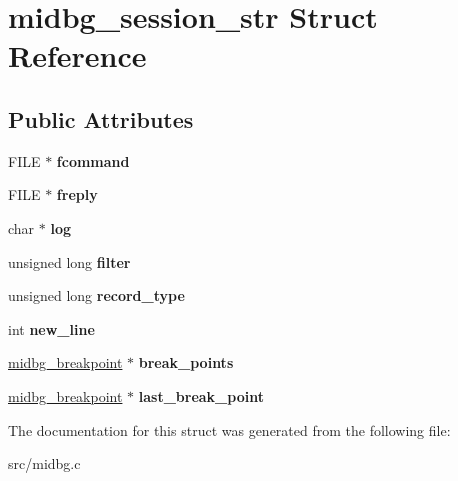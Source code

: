 \hypertarget{structmidbg__session__str}{\section{midbg\-\_\-session\-\_\-str Struct Reference}
\label{structmidbg__session__str}
}
\subsection*{Public Attributes}
\begin{DoxyCompactItemize}
\item 
\hypertarget{structmidbg__session__str_a11e3ab64f4075641374676b39d3a1be5}{F\-I\-L\-E $\ast$ {\bfseries fcommand}}\label{structmidbg__session__str_a11e3ab64f4075641374676b39d3a1be5}

\item 
\hypertarget{structmidbg__session__str_aa3da275f108db9374ff4e588b81d1f6c}{F\-I\-L\-E $\ast$ {\bfseries freply}}\label{structmidbg__session__str_aa3da275f108db9374ff4e588b81d1f6c}

\item 
\hypertarget{structmidbg__session__str_a09a9feea0b0fd9400966ce8da0b15ba4}{char $\ast$ {\bfseries log}}\label{structmidbg__session__str_a09a9feea0b0fd9400966ce8da0b15ba4}

\item 
\hypertarget{structmidbg__session__str_afec0633fe22980753c86ec7eb381e225}{unsigned long {\bfseries filter}}\label{structmidbg__session__str_afec0633fe22980753c86ec7eb381e225}

\item 
\hypertarget{structmidbg__session__str_ab434d7231bc25f1b8f89c30b79294cc6}{unsigned long {\bfseries record\-\_\-type}}\label{structmidbg__session__str_ab434d7231bc25f1b8f89c30b79294cc6}

\item 
\hypertarget{structmidbg__session__str_a34d646b5e885d2b5ac244cdb14197ba0}{int {\bfseries new\-\_\-line}}\label{structmidbg__session__str_a34d646b5e885d2b5ac244cdb14197ba0}

\item 
\hypertarget{structmidbg__session__str_ad7d994627e0bc66aa18d5cc1f180d82b}{\hyperlink{structmidbg__breakpoint}{midbg\-\_\-breakpoint} $\ast$ {\bfseries break\-\_\-points}}\label{structmidbg__session__str_ad7d994627e0bc66aa18d5cc1f180d82b}

\item 
\hypertarget{structmidbg__session__str_a72c71dfae20e81dee143908e1126004b}{\hyperlink{structmidbg__breakpoint}{midbg\-\_\-breakpoint} $\ast$ {\bfseries last\-\_\-break\-\_\-point}}\label{structmidbg__session__str_a72c71dfae20e81dee143908e1126004b}

\end{DoxyCompactItemize}


The documentation for this struct was generated from the following file\-:\begin{DoxyCompactItemize}
\item 
src/midbg.\-c\end{DoxyCompactItemize}
